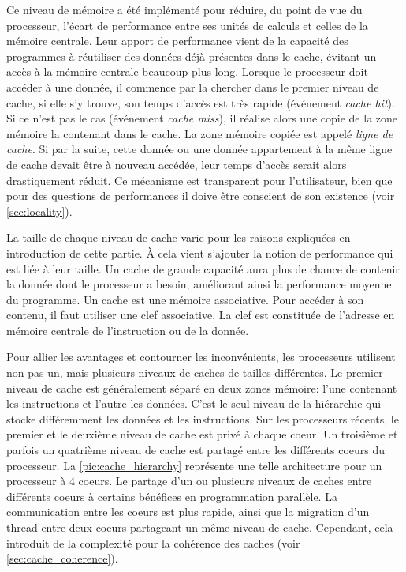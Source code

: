 Ce niveau de mémoire a été implémenté pour réduire, du point de vue du processeur, l'écart de performance entre ses unités de calculs et celles de la mémoire centrale. Leur apport de performance vient de la capacité des programmes à réutiliser des données déjà présentes dans le cache, évitant un accès à la mémoire centrale beaucoup plus long. Lorsque le processeur doit accéder à une donnée, il commence par la chercher dans le premier niveau de cache, si elle s’y trouve, son temps d'accès est très rapide (événement \textit{cache hit}). Si ce n'est pas le cas (événement \textit{cache miss}), il réalise alors une copie de la zone mémoire la contenant dans le cache. La zone mémoire copiée est appelé \textit{ligne de cache}. Si par la suite, cette donnée ou une donnée appartement à la même ligne de cache devait être à nouveau accédée, leur temps d'accès serait alors drastiquement réduit. Ce mécanisme est transparent pour l'utilisateur, bien que pour des questions de performances il doive être conscient de son existence (voir \autoref{sec:locality}). 

La taille de chaque niveau de cache varie pour les raisons expliquées en introduction de cette partie. À cela vient s'ajouter la notion de performance qui est liée à leur taille. Un cache de grande capacité aura plus de chance de contenir la donnée dont le processeur a besoin, améliorant ainsi la performance moyenne du programme. Un cache est une mémoire associative. Pour accéder à son contenu, il faut utiliser une clef associative. La clef est constituée de l'adresse en mémoire centrale de l'instruction ou de la donnée.

Pour allier les avantages et contourner les inconvénients, les processeurs utilisent non pas un, mais plusieurs niveaux de caches de tailles différentes.
Le premier niveau de cache est généralement séparé en deux zones mémoire: l'une contenant les instructions et l'autre les données. C'est le seul niveau de la hiérarchie qui stocke différemment les données et les instructions. Sur les processeurs récents, le premier et le deuxième niveau de cache est privé à chaque coeur. Un troisième et parfois un quatrième niveau de cache est partagé entre les différents coeurs du processeur. La \autoref{pic:cache_hierarchy} représente une telle architecture pour un processeur à 4 coeurs. Le partage d'un ou plusieurs niveaux de caches entre différents coeurs à certains bénéfices en programmation parallèle. La communication entre les coeurs est plus rapide, ainsi que la migration d'un thread entre deux coeurs partageant un même niveau de cache. Cependant, cela introduit de la complexité pour la cohérence des caches (voir \autoref{sec:cache_coherence}).


